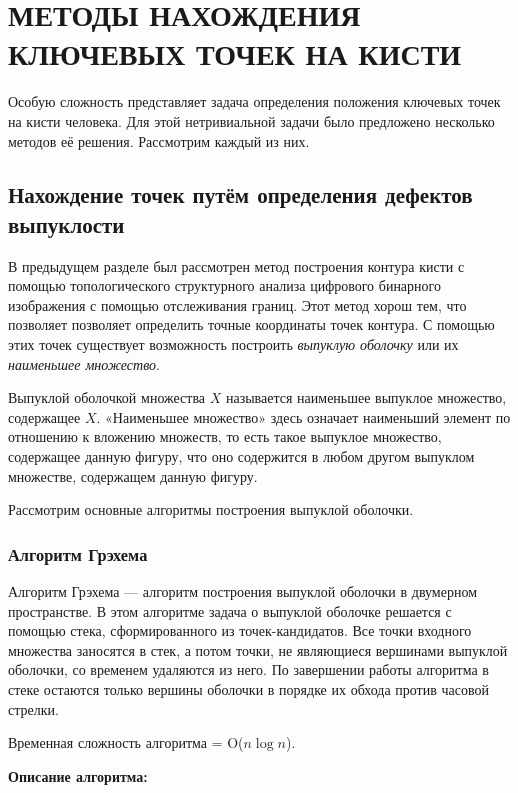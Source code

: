 \section{МЕТОДЫ НАХОЖДЕНИЯ КЛЮЧЕВЫХ ТОЧЕК НА КИСТИ}

Особую сложность представляет задача 
определения положения ключевых точек на кисти человека.
Для этой нетривиальной задачи было предложено
несколько методов её решения. Рассмотрим каждый из них.

\subsection{Нахождение точек путём определения дефектов 
выпуклости}

В предыдущем разделе был рассмотрен метод построения контура
кисти с помощью топологического структурного анализа
цифрового бинарного изображения с помощью отслеживания
границ. Этот метод хорош тем, что позволяет позволяет
определить точные координаты точек контура. С помощью этих
точек существует возможность построить {\it выпуклую
оболочку} или их {\it наименьшее множество}.

Выпуклой оболочкой множества $X$ называется наименьшее
выпуклое множество, содержащее $X$. 
«Наименьшее множество» здесь означает наименьший элемент по
отношению к вложению множеств, то есть такое выпуклое
множество, содержащее данную фигуру, что оно содержится в
любом другом выпуклом множестве, содержащем данную фигуру.

Рассмотрим основные алгоритмы построения выпуклой оболочки.

\subsubsection{Алгоритм Грэхема}

Алгоритм Грэхема\cite{graham} — алгоритм построения выпуклой
оболочки в двумерном пространстве. В этом алгоритме задача о
выпуклой оболочке решается с помощью стека, сформированного
из точек-кандидатов. Все точки входного множества заносятся в
стек, а потом точки, не являющиеся вершинами выпуклой
оболочки, со временем удаляются из него. По завершении работы
алгоритма в стеке остаются только вершины оболочки в порядке
их обхода против часовой стрелки.

Временная сложность алгоритма = O($n\log{n}$).

{\bf Описание алгоритма:}


